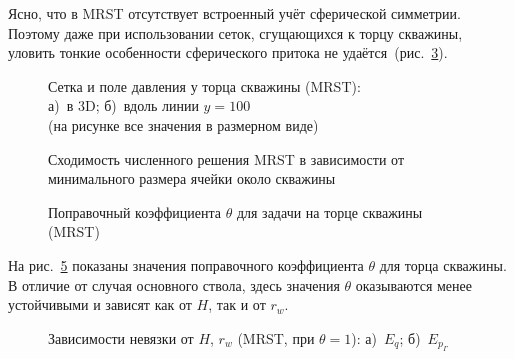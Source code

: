 \documentclass{article}
\begin{document}
Ясно, что в MRST отсутствует встроенный учёт сферической симметрии.
Поэтому даже при использовании сеток, сгущающихся к торцу скважины,
уловить тонкие особенности сферического притока не удаётся~(рис.~\ref{fig:kham_hw_outer_grid_mrst}).
\begin{figure}[!ht]
\centering
\begin{subfigure}{0.48\textwidth}
\centering

\caption{}
\label{fig:kham_hw_outer_grid_mrst_3D}
\end{subfigure}
\hfill
\begin{subfigure}{0.48\textwidth}
\centering

\caption{}
\label{fig:kham_hw_outer_grid_mrst_xz}
\end{subfigure}
\caption{
Сетка и поле давления у торца скважины (MRST): \\
а)~в 3D;
б)~вдоль линии $y=100$ \\
(на рисунке все значения в размерном виде)
}
\label{fig:kham_hw_outer_grid_mrst}
\end{figure}

\begin{figure}[!ht]
\centering

\caption{\label{fig:kham_hw_outer_q_C_conv_MRST}Сходимость численного решения MRST в зависимости от минимального размера ячейки около скважины}
\end{figure}

\begin{figure}[!ht]
\centering

\caption{Поправочный коэффициента $\theta$ для задачи на торце скважины (MRST)}
\label{fig:kham_hw_outer_theta_map_mrst}
\end{figure}

На рис.~\ref{fig:kham_hw_outer_theta_map_mrst} показаны значения поправочного коэффициента $\theta$ для торца скважины. В отличие от случая основного ствола, здесь значения $\theta$ оказываются менее устойчивыми и зависят как от $H$, так и от $r_w$.

\begin{figure}[!ht]
\centering
\begin{subfigure}{0.48\textwidth}
\centering

\caption{}
\label{fig:kham_hw_outer_eq_map_mrst}
\end{subfigure}
\hfill
\begin{subfigure}{0.48\textwidth}
\centering

\caption{}
\label{fig:kham_hw_outer_epg_map_mrst}
\end{subfigure}
\caption{
Зависимости невязки от $H$, $r_w$ (MRST, при $\theta = 1$):
а)~$E_q$;
б)~$E_{p_{\Gamma}}$
}
\label{fig:kham_hw_outer_eq_epg_maps_mrst}
\end{figure}
\end{document}

